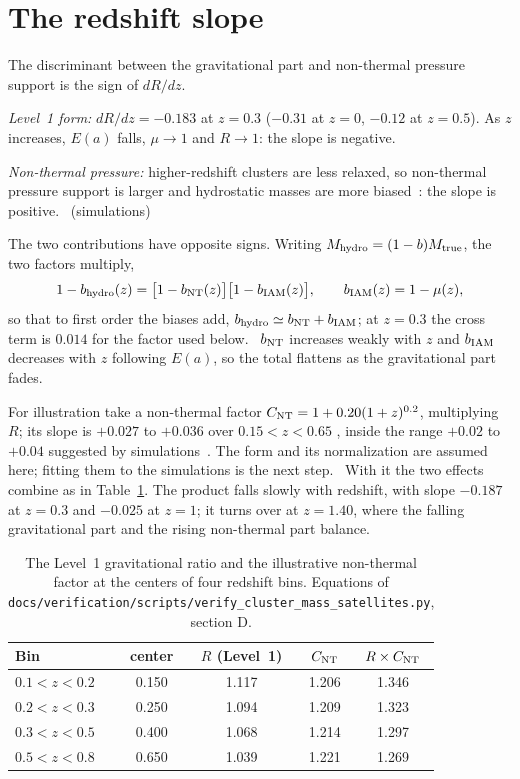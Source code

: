 \section{The redshift slope}\label{sec:tw_slope}
The discriminant between the gravitational part and non-thermal pressure support is the sign of $dR/dz$.

\emph{Level~1 form:} $dR/dz=-0.183$ at $z=0.3$ ($-0.31$ at $z=0$, $-0.12$ at $z=0.5$). As $z$ increases, $E(a)$ falls, $\mu\to1$ and $R\to1$: the
slope is negative. \calc

\emph{Non-thermal pressure:} higher-redshift clusters are less relaxed, so non-thermal pressure support is larger and hydrostatic masses are more
biased~\cite{Nelson2014,ShiKomatsu2014}: the slope is positive. \observed\ (simulations)

The two contributions have opposite signs. Writing $M_{\rm hydro}=(1-b)M_{\rm true}$, the two factors multiply,
\begin{equation}
1-b_{\rm hydro}(z)=\bigl[1-b_{\rm NT}(z)\bigr]\bigl[1-b_{\rm IAM}(z)\bigr],\qquad b_{\rm IAM}(z)=1-\mu(z),
\label{eq:tw_bias}\end{equation}
so that to first order the biases add, $b_{\rm hydro}\simeq b_{\rm NT}+b_{\rm IAM}$; at $z=0.3$ the cross term is $0.014$ for the factor used below.
\derived\ $b_{\rm NT}$ increases weakly with $z$ and $b_{\rm IAM}$ decreases with $z$ following $E(a)$, so the total flattens as the gravitational
part fades. \calc

For illustration take a non-thermal factor $C_{\rm NT}=1+0.20(1+z)^{0.2}$, multiplying $R$; its slope is $+0.027$ to $+0.036$ over $0.15<z<0.65$
\calc, inside the range $+0.02$ to $+0.04$ suggested by simulations~\cite{Nelson2014,ShiKomatsu2014}. The form and its normalization are assumed here; fitting them to the simulations is the next step. \openprob\ With it the two effects combine as in Table~\ref{tab:tw_bins}. The product falls slowly with redshift, with slope
$-0.187$ at $z=0.3$ and $-0.025$ at $z=1$; it turns over at $z=1.40$, where the falling gravitational part and the rising non-thermal part balance.
\calc

\begin{table}[htbp]\centering\small
\caption[Gravitational and non-thermal parts in four redshift bins]{The Level~1 gravitational ratio and the illustrative non-thermal factor at the
centers of four redshift bins. Equations of \texttt{docs/\allowbreak{}verification/\allowbreak{}scripts/\allowbreak{}verify\_cluster\_mass\_satellites.py},
section D. \calc}\label{tab:tw_bins}
\begin{tabular}{lcccc}\toprule
Bin & center & $R$ (Level~1) & $C_{\rm NT}$ & $R\times C_{\rm NT}$\\\midrule
$0.1<z<0.2$ & 0.150 & 1.117 & 1.206 & 1.346\\
$0.2<z<0.3$ & 0.250 & 1.094 & 1.209 & 1.323\\
$0.3<z<0.5$ & 0.400 & 1.068 & 1.214 & 1.297\\
$0.5<z<0.8$ & 0.650 & 1.039 & 1.221 & 1.269\\\bottomrule
\end{tabular}\end{table}


